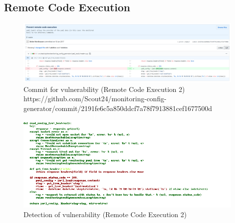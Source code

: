 \documentclass[
a4paper,
pagesize,
pdftex,
12pt,
twoside, %
BCOR=5mm, %
ngerman,
fleqn,
final,
]{scrartcl}
\begin{document}
	
	
	\subsection{Remote Code Execution}
	
	\begin{figure}[H]
		\centering
		\includegraphics[width=\linewidth]{Images/remote_code_executionA}
		\caption{Commit for vulnerability (Remote Code Execution 2) \newline \scriptsize{https://github.com/Scout24/monitoring-config-generator/commit/2191fe6c5a850ddcf7a78f7913881cef1677500d
		}}
		\label{fig:remote_code_executionA}
	\end{figure}
	\begin{figure}[H]
		\centering
		\includegraphics[width=\linewidth]{Images/remote_code_executionAr}
		\caption{Detection of vulnerability (Remote Code Execution 2)}
		\label{fig:remote_code_executionAr}
	\end{figure}
	
\end{document}
